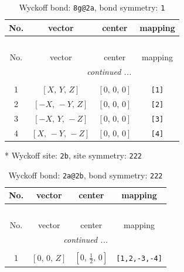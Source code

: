 \documentclass[fleqn,8pt]{jsarticle}
\begin{document}
\begin{longtable}{cccc}
\caption{Wyckoff bond: {\tt 8g@2a}, bond symmetry: {\tt 1}}
 \\
 \hline \hline
No. & vector & center & mapping \\ \hline \endfirsthead

\multicolumn{3}{l}{\tablename\ \thetable{}} \\
 \hline \hline
No. & vector & center & mapping \\ \hline \endhead

 \hline \hline
\multicolumn{3}{r}{\footnotesize\it continued ...} \\ \endfoot

 \hline \hline
\multicolumn{3}{r}{} \\ \endlastfoot

1 & $\left[ X,\, Y,\, Z \right]$ & $\left[ 0,\, 0,\, 0 \right]$ & {\tt [1]} \\ \hline
2 & $\left[ - X,\, - Y,\, Z \right]$ & $\left[ 0,\, 0,\, 0 \right]$ & {\tt [2]} \\ \hline
3 & $\left[ - X,\, Y,\, - Z \right]$ & $\left[ 0,\, 0,\, 0 \right]$ & {\tt [3]} \\ \hline
4 & $\left[ X,\, - Y,\, - Z \right]$ & $\left[ 0,\, 0,\, 0 \right]$ & {\tt [4]} \\
\end{longtable}
* Wyckoff site: {\tt 2b}, site symmetry: {\tt 222}
\renewcommand{\arraystretch}{1.2}
\begin{longtable}{cccc}
\caption{Wyckoff bond: {\tt 2a@2b}, bond symmetry: {\tt 222}}
 \\
 \hline \hline
No. & vector & center & mapping \\ \hline \endfirsthead

\multicolumn{3}{l}{\tablename\ \thetable{}} \\
 \hline \hline
No. & vector & center & mapping \\ \hline \endhead

 \hline \hline
\multicolumn{3}{r}{\footnotesize\it continued ...} \\ \endfoot

 \hline \hline
\multicolumn{3}{r}{} \\ \endlastfoot

1 & $\left[ 0,\, 0,\, Z \right]$ & $\left[ 0,\, \frac{1}{2},\, 0 \right]$ & {\tt [1,2,-3,-4]} \\
\end{longtable}
\renewcommand{\arraystretch}{1.2}
\end{document}
